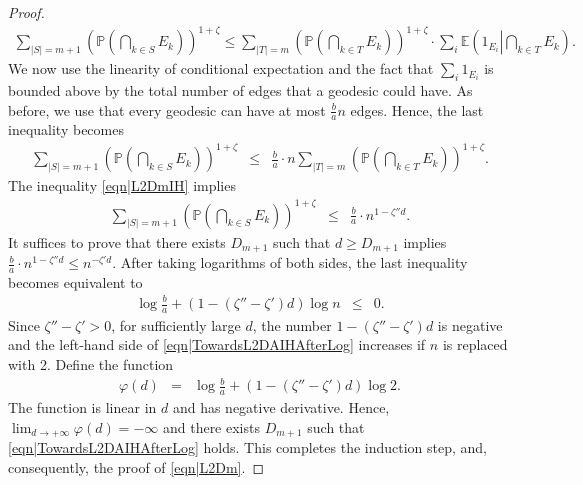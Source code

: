 \documentclass[reqno]{amsart}
\begin{document}
\begin{proof}
\begin{align}
\sum_{|S|=m+1} \left(\mathbb P\left(\bigcap_{k\in S}E_k\right)\right)^{1+\zeta}\leq
\sum_{|T|=m}\left(\mathbb P\left(\bigcap_{k\in T}E_k\right)\right)^{1+\zeta}\cdot \sum_i \mathbb E\left( 1_{E_i}\left| \bigcap_{k\in T}E_k\right.\right).   
\nonumber
\end{align}
We now use the linearity of conditional expectation and the fact that $\sum_i1_{E_i}$ is bounded above by the total number of edges that a geodesic could have. As before, we use that every geodesic can have at most $\frac ba n$ edges. Hence, the last inequality  
becomes
\begin{eqnarray}
\sum_{|S|=m+1} \left(\mathbb P\left(\bigcap_{k\in S}E_k\right)\right)^{1+\zeta}&\leq& \frac ba\cdot n
\sum_{|T|=m}\left(\mathbb P\left(\bigcap_{k\in T}E_k\right)\right)^{1+\zeta}.
\label{eqn|TowardsL2Dmp1}
\end{eqnarray}
 The inequality \eqref{eqn|L2DmIH} implies 
 \begin{eqnarray}
\sum_{|S|=m+1} \left(\mathbb P\left(\bigcap_{k\in S}E_k\right)\right)^{1+\zeta}&\leq& \frac ba\cdot n^{1-\zeta''d}.
\label{eqn|TowardsL2DAIH}
\end{eqnarray}
It suffices to prove that there exists $D_{m+1}$ such that $d\geq D_{m+1}$ implies 
$\frac ba\cdot n^{1-\zeta''d}\leq n^{-\zeta'd}$. After taking logarithms of both sides, the last inequality becomes equivalent to 
\begin{eqnarray}
\log\frac ba+(1-(\zeta''-\zeta')d)\log n&\leq& 0. \label{eqn|TowardsL2DAIHAfterLog}
\end{eqnarray}
Since $\zeta''-\zeta'>0$, for sufficiently large $d$, the number $1-(\zeta''-\zeta')d$ is negative and the left-hand side of 
\eqref{eqn|TowardsL2DAIHAfterLog} increases if $n$ is replaced with 2. Define the function 
\begin{eqnarray*}
\varphi(d)&=&\log\frac ba+(1-(\zeta''-\zeta')d)\log 2.
\end{eqnarray*}
The function is linear in $d$ and has negative derivative. Hence, $\lim_{d\to+\infty}\varphi(d)=-\infty$ and there exists $D_{m+1}$ such that \eqref{eqn|TowardsL2DAIHAfterLog} holds. This completes the induction step, and, consequently, the proof of \eqref{eqn|L2Dm}.
\end{proof}
\end{document}

